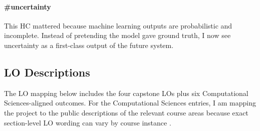 \documentclass[11pt]{article}
\begin{document}
\paragraph{\#uncertainty}
This HC mattered because machine learning outputs are probabilistic and incomplete. Instead of pretending the model gave ground truth, I now see uncertainty as a first-class output of the future system.

\subsection{LO Descriptions}
The LO mapping below includes the four capstone LOs plus six Computational Sciences-aligned outcomes. For the Computational Sciences entries, I am mapping the project to the public descriptions of the relevant course areas because exact section-level LO wording can vary by course instance \cite{minervacs}.
\end{document}
